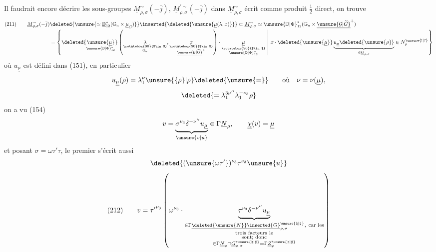 Il faudrait encore décrire les sous-groupes
$\underline M_{\rho,\sigma}^{\sim}(-\bar j)$,
$\underline M_{\rho,\sigma}^{\prime\sim}(-\bar j)$
dans $\underline M_{\rho,\sigma}^{\sim}$ écrit comme produit
$\frac12$ direct, on trouve
\[
\begin{aligned}
(211)\qquad
\underline M_{\rho,\sigma}^{\sim}(-\bar j)
&\deleted{\unsure{\simeq\underline{\mathbb D}_{12}^{*}
(\mathbb G_a\times\underline\mu_G)}}
\inserted{\deleted{\unsure{\underline\mu(\lambda,x)}}}
\subset \underline M_{\rho,\sigma}^{\sim}
\simeq \unsure{\mathbb D|\Phi}_{12}^{*}
(\mathbb G_a\times\underline{\unsure{\mathcal G|\widetilde G}}^{+})
\\[-1pt]
&=\left\{
\deleted{\underset{\unsure{\mathbb D|\Phi}_{12}^{*}}
{\unsure{\underline\mu}}}
\left(
\underset{\substack{\rotatebox{90}{$\in$}\\\mathbb G_a}}{\lambda},
\underset{\substack{\rotatebox{90}{$\in$}\\
\underline{\unsure{\mathcal G|\widetilde G}}^{+}}}{x}
\right)\cdot
\underset{\substack{\rotatebox{90}{$\in$}\\
\unsure{\mathbb D|\Phi}_{12}^{*}}}{\underline\mu}
\ \middle|\ x\cdot\deleted{\unsure{\underline\mu}}
\underbrace{u_{\underline\mu}\deleted{\unsure{\rho}}}
_{\in\underline G_{\rho,\sigma}}
\in N_\rho^{\unsure{!|?}}\right\}
\end{aligned}
\]
où $u_{\underline\mu}$ est défini dans (151), en particulier
\[
u_{\underline\mu}(\rho)=\lambda_1^{\nu}
\unsure{\{\rho\}|\rho}\deleted{\unsure{=}}
\qquad\text{où}\quad \nu=\nu(\underline\mu),
\]
\[
\deleted{=\lambda_1^{3\nu''}\lambda_1^{-\nu_3}\rho}
\]
on a vu (154)
\[
v=\underbrace{\sigma^{\nu_3}\delta^{-\nu''}u_{\underline\mu}}
_{\unsure{v|u}}\in\Gamma\underline N_\rho,
\qquad \underline\chi(v)=\underline\mu
\]
et posant $\sigma=\omega\tau'\tau$, le premier
 s'écrit aussi
\[
\deleted{(\unsure{\omega\tau'})^{\nu_3}\tau^{\nu_3}\unsure{u}}
\]
\[
(212)\qquad
v={\tau'}^{\nu_3}\left(\omega^{\nu_3}\cdot
\underbrace{\tau^{\nu_3}\delta^{-\nu''}u_{\underline\mu}}
_{\substack{
\in\Gamma\underline{\deleted{\unsure{N}}\inserted{G}}
_{\rho,\sigma}^{\unsure{\natural|\sharp}},\ \text{car les}\\
\text{trois facteurs le}\\
\text{sont; donc}\\
\in\Gamma\underline N_\rho\cap
\underline G_{\rho,\sigma}^{\unsure{\natural|\sharp}}
=\Gamma\underline Z_\rho^{\unsure{\natural|\sharp}}
}}\right)
\]

